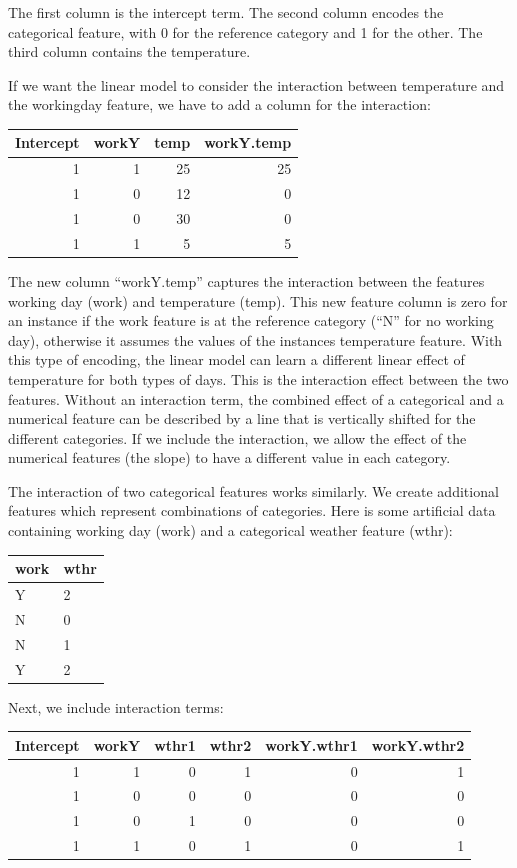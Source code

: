 \documentclass[12pt,]{krantz}
\begin{document}
The first column is the intercept term. The second column encodes the
categorical feature, with 0 for the reference category and 1 for the
other. The third column contains the temperature.

If we want the linear model to consider the interaction between
temperature and the workingday feature, we have to add a column for the
interaction:

\begin{tabular}{r|r|r|r}
\hline
Intercept & workY & temp & workY.temp\\
\hline
1 & 1 & 25 & 25\\
\hline
1 & 0 & 12 & 0\\
\hline
1 & 0 & 30 & 0\\
\hline
1 & 1 & 5 & 5\\
\hline
\end{tabular}

The new column ``workY.temp'' captures the interaction between the
features working day (work) and temperature (temp). This new feature
column is zero for an instance if the work feature is at the reference
category (``N'' for no working day), otherwise it assumes the values of
the instances temperature feature. With this type of encoding, the
linear model can learn a different linear effect of temperature for both
types of days. This is the interaction effect between the two features.
Without an interaction term, the combined effect of a categorical and a
numerical feature can be described by a line that is vertically shifted
for the different categories. If we include the interaction, we allow
the effect of the numerical features (the slope) to have a different
value in each category.

The interaction of two categorical features works similarly. We create
additional features which represent combinations of categories. Here is
some artificial data containing working day (work) and a categorical
weather feature (wthr):

\begin{tabular}{l|l}
\hline
work & wthr\\
\hline
Y & 2\\
\hline
N & 0\\
\hline
N & 1\\
\hline
Y & 2\\
\hline
\end{tabular}

Next, we include interaction terms:

\begin{tabular}{r|r|r|r|r|r}
\hline
Intercept & workY & wthr1 & wthr2 & workY.wthr1 & workY.wthr2\\
\hline
1 & 1 & 0 & 1 & 0 & 1\\
\hline
1 & 0 & 0 & 0 & 0 & 0\\
\hline
1 & 0 & 1 & 0 & 0 & 0\\
\hline
1 & 1 & 0 & 1 & 0 & 1\\
\hline
\end{tabular}
\end{document}
